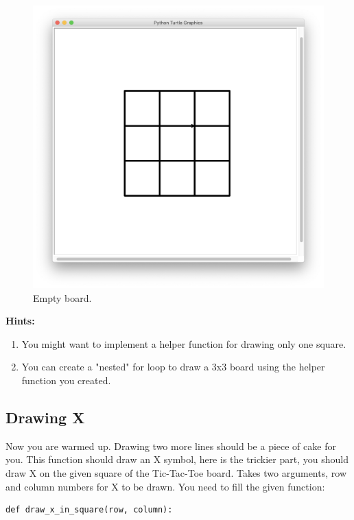 \documentclass[a4paper]{article}
\begin{document}
\begin{figure}[!htb]
\centering
\includegraphics[width=1\textwidth]{empty_board.png}
\caption{Empty board.}\label{fig:outputs}
\end{figure}

\textbf{Hints:}
\begin{enumerate}
\item You might want to implement a helper function for drawing only one square.
\item You can create a "nested" for loop to draw a 3x3 board using the helper function you created.
\end{enumerate}

\newpage
\subsection{Drawing X}
Now you are warmed up. Drawing two more lines should be a piece of cake for you. This function should draw an X symbol, here is the trickier part, you should draw X on the given square of the Tic-Tac-Toe board. Takes two arguments, row and column numbers for X to be drawn. You need to fill the given function:

\begin{lstlisting} 
def draw_x_in_square(row, column):
\end{lstlisting}
\end{document}
